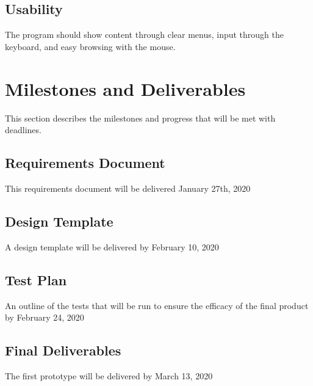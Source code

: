 \documentclass{article}
\begin{document}
\subsection{Usability}
The program should show content through clear menus, input through the keyboard, and easy browsing with the mouse.




\section{Milestones and Deliverables}
This section describes the milestones and progress that will be met with deadlines.


\subsection{Requirements Document}
This requirements document will be delivered January 27th, 2020

\subsection{Design Template}
A design template will be delivered by February 10, 2020

\subsection{Test Plan}
An outline of the tests that will be run to ensure the efficacy of the final product by February 24, 2020

\subsection{Final Deliverables}
The first prototype will be delivered by March 13, 2020
\end{document}

